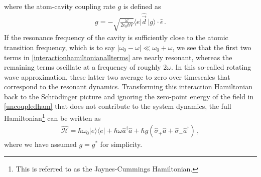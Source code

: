 \documentclass[../Thesis-IJspeert.tex]{subfiles}
\begin{document}
where the atom-cavity coupling rate $g$ is defined as
\begin{align}
g = -\sqrt{\frac{\omega}{2\epsilon_0\hbar V}} \langle e \vert \hat{\vec{d}} \, \vert g \rangle \cdot \hat{\epsilon}\,.
\end{align}
If the resonance frequency of the cavity is sufficiently close to the atomic transition frequency, which is to say $\vert \omega_0-\omega\vert \ll \omega_0 + \omega$, we see that the first two terms in \autoref{interactionhamiltonianallterms} are nearly resonant, whereas the remaining terms oscillate at a frequency of roughly $2\omega$. In this so-called rotating wave approximation, these latter two average to zero over timescales that correspond to the resonant dynamics. Transforming this interaction Hamiltonian back to the Schr\"{o}dinger picture and ignoring the zero-point energy of the field in \autoref{uncoupledham} that does not contribute to the system dynamics, the full Hamiltonian\footnote{This is referred to as the Jaynes-Cummings Hamiltonian.} can be written as
\begin{align}
\label{JC}
\hat{\mathcal{H}}=\hbar\omega_0 \vert e \rangle \langle e \vert + \hbar \omega \hat{a}^\dagger \hat{a} + \hbar g(\hat{\sigma}_+\hat{a} + \hat{\sigma}_-\hat{a}^\dagger)\,,
\end{align}
where we have assumed $g=g^*$ for simplicity.
\end{document}
